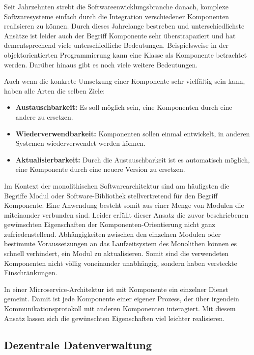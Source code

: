 Seit Jahrzehnten strebt die Softwareenwicklungsbranche danach, komplexe Softwaresysteme einfach durch die Integration verschiedener Komponenten realisieren zu können. Durch dieses Jahrelange bestreben und unterschiedlichste Ansätze ist leider auch der Begriff Komponente sehr überstrapaziert und hat dementsprechend viele unterschiedliche Bedeutungen. Beispielsweise in der objektorientierten Programmierung kann eine Klasse als Komponente betrachtet werden. Darüber hinaus gibt es noch viele weitere Bedeutungen.

Auch wenn die konkrete Umsetzung einer Komponente sehr vielfältig sein kann, haben alle Arten die selben Ziele:

\begin{itemize}
	\item \textbf{Austauschbarkeit:} Es soll möglich sein, eine Komponenten durch eine andere zu ersetzen. 
	\item \textbf{Wiederverwendbarkeit:} Komponenten sollen einmal entwickelt, in anderen Systemen wiederverwendet werden können.
	\item \textbf{Aktualisierbarkeit:} Durch die Austauschbarkeit ist es automatisch möglich, eine Komponente durch eine neuere Version zu ersetzen.
\end{itemize}

Im Kontext der monolithischen Softwarearchitektur sind am häufigsten die Begriffe Modul oder Software-Bibliothek stellvertretend für den Begriff Komponente. Eine Anwendung besteht somit aus einer Menge von Modulen die miteinander verbunden sind. Leider erfüllt dieser Ansatz die zuvor beschriebenen gewünschten Eigenschaften der Komponenten-Orientierung nicht ganz zufriedenstellend. Abhängigkeiten zwischen den einzelnen Modulen oder bestimmte Voraussetzungen an das Laufzeitsystem des Monolithen können es schnell verhindert, ein Modul zu aktualisieren. Somit sind die verwendeten Komponenten nicht völlig voneinander unabhängig, sondern haben versteckte Einschränkungen.

In einer Microservice-Architektur ist mit Komponente ein einzelner Dienst gemeint. Damit ist jede Komponente einer eigener Prozess, der über irgendein Kommunikationsprotokoll mit anderen Komponenten interagiert. Mit diesem Ansatz lassen sich die gewünschten Eigenschaften viel leichter realisieren.

\subsection{Dezentrale Datenverwaltung}

